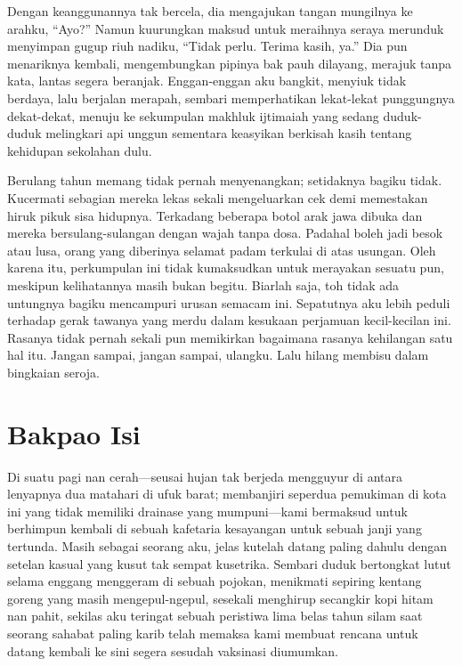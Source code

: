 \documentclass[smalldemyvopaper,11pt,twoside,onecolumn,openright,extrafontsizes]{memoir}
\begin{document}

Dengan keanggunannya tak bercela, dia mengajukan tangan mungilnya ke arahku, ``Ayo?'' Namun kuurungkan maksud untuk meraihnya seraya merunduk menyimpan gugup riuh nadiku, ``Tidak perlu. Terima kasih, ya.'' Dia pun menariknya kembali, mengembungkan pipinya bak pauh dilayang, merajuk tanpa kata, lantas segera beranjak. Enggan-enggan aku bangkit, menyiuk tidak berdaya, lalu berjalan merapah, sembari memperhatikan lekat-lekat punggungnya dekat-dekat, menuju ke sekumpulan makhluk ijtimaiah yang sedang duduk-duduk melingkari api unggun sementara keasyikan berkisah kasih tentang kehidupan sekolahan dulu.

Berulang tahun memang tidak pernah menyenangkan; setidaknya bagiku tidak. Kucermati sebagian mereka lekas sekali mengeluarkan cek demi memestakan hiruk pikuk sisa hidupnya. Terkadang beberapa botol arak jawa dibuka dan mereka bersulang-sulangan dengan wajah tanpa dosa. Padahal boleh jadi besok atau lusa, orang yang diberinya selamat padam terkulai di atas usungan. Oleh karena itu, perkumpulan ini tidak kumaksudkan untuk merayakan sesuatu pun, meskipun kelihatannya masih bukan begitu. Biarlah saja, toh tidak ada untungnya bagiku mencampuri urusan semacam ini. Sepatutnya aku lebih peduli terhadap gerak tawanya yang merdu dalam kesukaan perjamuan kecil-kecilan ini. Rasanya tidak pernah sekali pun memikirkan bagaimana rasanya kehilangan satu hal itu. Jangan sampai, jangan sampai, ulangku. Lalu hilang membisu dalam bingkaian seroja.

\chapter{Bakpao Isi}


Di suatu pagi nan cerah---seusai hujan tak berjeda mengguyur di antara lenyapnya dua matahari di ufuk barat; membanjiri seperdua pemukiman di kota ini yang tidak memiliki drainase yang mumpuni---kami bermaksud untuk berhimpun kembali di sebuah kafetaria kesayangan untuk sebuah janji yang tertunda. Masih sebagai seorang aku, jelas kutelah datang paling dahulu dengan setelan kasual yang kusut tak sempat kusetrika. Sembari duduk bertongkat lutut selama enggang menggeram di sebuah pojokan, menikmati sepiring kentang goreng yang masih mengepul-ngepul, sesekali menghirup secangkir kopi hitam nan pahit, sekilas aku teringat sebuah peristiwa lima belas tahun silam saat seorang sahabat paling karib telah memaksa kami membuat rencana untuk datang kembali ke sini segera sesudah vaksinasi diumumkan.
\end{document}
